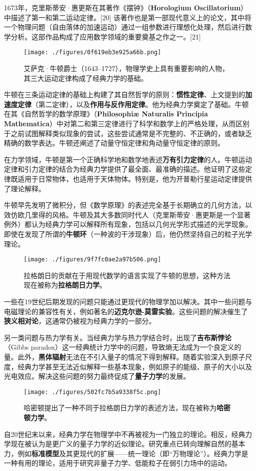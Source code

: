 1673年，克里斯蒂安·惠更斯在其著作《摆钟》（\textbf{Horologium Oscillatorium}）中描述了第一和第二运动定律。[20] 该著作也是第一部现代意义上的论文，其中将一个物理问题（自由落体的加速运动）通过一组参数进行理想化处理，然后进行数学分析。这部作品构成了应用数学领域的重要奠基之作之一。[21]
\begin{figure}[ht]
\centering
\texttt{[image: ./figures/0f619eb3e925a66b.png]}
\caption{艾萨克·牛顿爵士（1643–1727），物理学史上具有重要影响的人物，其三大运动定律构成了经典力学的基础。} \label{fig_JDLX_5}
\end{figure}
牛顿在三条运动定律的基础上构建了其自然哲学的原则：\textbf{惯性定律}、上文提到的\textbf{加速度定律}（第二定律），以及\textbf{作用与反作用定律}。他为经典力学奠定了基础。牛顿在其《自然哲学的数学原理》（\textbf{Philosophiæ Naturalis Principia Mathematica}）中对第二和第三定律进行了科学和数学上的严格处理，从而区别于之前试图解释类似现象的尝试，这些尝试通常是不完整的、不正确的，或者缺乏精确的数学表达。牛顿还阐述了动量守恒定律和角动量守恒定律的原则。

在力学领域，牛顿是第一个正确科学地和数学地表述\textbf{万有引力定律}的人。牛顿运动定律和引力定律的结合为经典力学提供了最全面、最准确的描述。他证明了这些定律既适用于日常物体，也适用于天体物体。特别是，他为开普勒行星运动定律提供了理论解释。

牛顿早先发明了微积分，但《数学原理》的表述完全基于长期确立的几何方法，以效仿欧几里得的风格。牛顿及其大多数同时代人（克里斯蒂安·惠更斯是一个显著例外）都认为经典力学可以解释所有现象，包括以几何光学形式描述的光学现象。即使在发现了所谓的\textbf{牛顿环}（一种波的干涉现象）后，他仍然坚持自己的粒子光学理论。
\begin{figure}[ht]
\centering
\texttt{[image: ./figures/9f7fc0ae2a97b506.png]}
\caption{拉格朗日的贡献在于用现代数学的语言实现了牛顿的思想，这种方法现在被称为\textbf{拉格朗日力学}。} \label{fig_JDLX_6}
\end{figure}
一些在19世纪后期发现的问题只能通过更现代的物理学加以解决。其中一些问题与电磁理论的兼容性有关，例如著名的\textbf{迈克尔逊-莫雷实验}。这些问题的解决催生了\textbf{狭义相对论}，这通常仍被视为经典力学的一部分。

另一类问题与热力学有关。当经典力学与热力学结合时，出现了\textbf{吉布斯悖论}（Gibbs paradox）这一经典统计力学中的问题，导致熵无法成为一个良定义的量。此外，\textbf{黑体辐射}无法在不引入量子的情况下得到解释。随着实验深入到原子尺度，经典力学甚至无法近似解释一些基本现象，例如原子的能级、原子的大小以及光电效应。解决这些问题的努力最终促成了\textbf{量子力学}的发展。
\begin{figure}[ht]
\centering
\texttt{[image: ./figures/502fc7b5a9338f5c.png]}
\caption{哈密顿提出了一种不同于拉格朗日力学的表述方法，现在被称为\textbf{哈密顿力学}。} \label{fig_JDLX_7}
\end{figure}
自20世纪末以来，经典力学在物理学中不再被视为一门独立的理论。相反，经典力学现在被认为是更广义的量子力学的近似理论。研究重点已转向理解自然的基本力，例如\textbf{标准模型}及其更现代的扩展——统一理论（即“万物理论”）。经典力学是一种有用的理论，适用于研究非量子力学、低能粒子在弱引力场中的运动。
